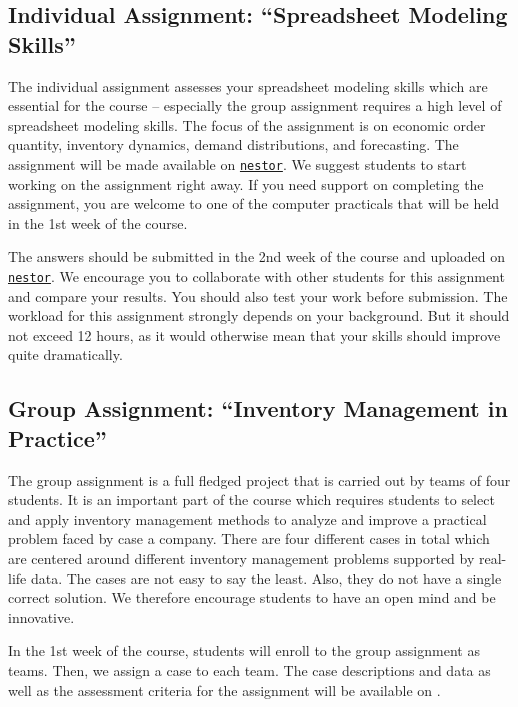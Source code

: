\documentclass{article}
\begin{document}
\subsection{Individual Assignment: ``Spreadsheet Modeling Skills''}
\label{sec:individual}

The individual assignment assesses your spreadsheet modeling skills which are essential for the course -- especially the group assignment requires a high level of spreadsheet modeling skills. The focus of the assignment is on economic order quantity, inventory dynamics, demand distributions, and forecasting. The assignment will be made available on \href{nestor.rug.nl}{\texttt{nestor}}. We suggest students to start working on the assignment right away. If you need support on completing the assignment, you are welcome to one of the computer practicals that will be held in the 1st week of the course. 

The answers should be submitted in the 2nd week of the course and uploaded on \href{nestor.rug.nl}{\texttt{nestor}}. We encourage you to collaborate with other students for this assignment and compare your results. You should also test your work before submission. The workload for this assignment strongly depends on your background. But it should not exceed 12 hours, as it would otherwise mean that your skills should improve quite dramatically. 

\subsection{Group Assignment: ``Inventory Management in Practice''}
\label{sec:group}

The group assignment is a full fledged project that is carried out by teams of four students. It is an important part of the course which requires students to select and apply inventory management methods to analyze and improve a practical problem faced by case a company. There are four different cases in total which are centered around different inventory management problems supported by real-life data. The cases are not easy to say the least. Also, they do not have a single correct solution. We therefore encourage students to have an open mind and be innovative. 

In the 1st week of the course, students will enroll to the group assignment as teams. Then, we assign a case to each team. The case descriptions and data as well as the assessment criteria for the assignment will be available on \nestor.
\end{document}
